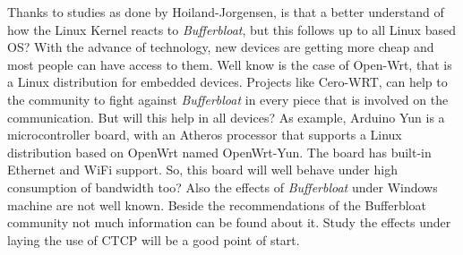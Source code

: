 Thanks to studies as done by Hoiland-Jorgensen\cite{TokeLinux}, is that a
better understand of how the Linux Kernel reacts to \emph{Bufferbloat}, but
this follows up to all Linux based OS? With the advance of technology, new
devices are getting more cheap and most people can have access to them. Well
know is the case of Open-Wrt\cite{openwrt}, that is a Linux distribution for
embedded devices. Projects like Cero-WRT\cite{cerowrt}, can help to the
community to fight against \emph{Bufferbloat} in every piece that is
involved on the communication. But will this help in all devices? As example,
Arduino Yun is a microcontroller board, with an Atheros processor that
supports a Linux distribution based on OpenWrt named OpenWrt-Yun. The board
has built-in Ethernet and WiFi support. So, this board will well behave under
high consumption of bandwidth too? Also the effects of \emph{Bufferbloat}
under Windows machine are not well known. Beside the recommendations of the
Bufferbloat community\cite{windowstips} not much information can be found
about it. Study the effects under laying the use of
CTCP\cite{Tan06compoundtcp}\cite{4146841} will be a good point of start.

